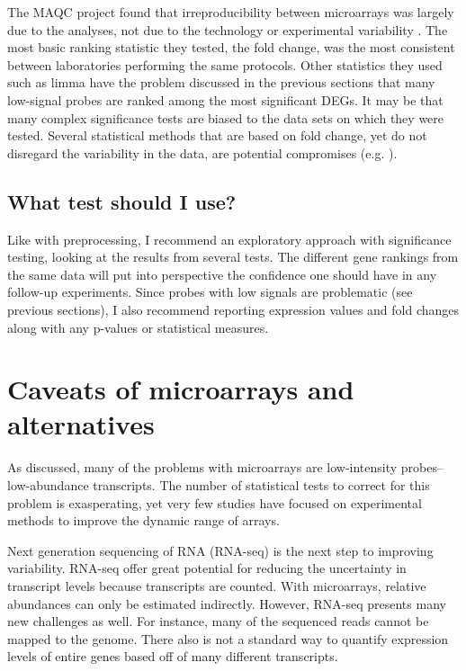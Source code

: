 The MAQC project found that irreproducibility between
microarrays was largely due to the analyses, not due to the technology
or experimental variability \cite{Shi:2006dl}.
The most basic ranking statistic they tested, the fold change, 
was the most consistent between laboratories performing the same protocols.
Other statistics they used such as limma have the problem discussed in the previous
sections that many low-signal probes are ranked among the most significant DEGs.
It may be that many complex significance tests are biased to
the data sets on which they were tested. Several statistical
methods that are based on fold change, yet do not disregard
the variability in the data, are potential 
compromises (e.g. \cite{Dembele:2014cn,Yanofsky:2010by,Farztdinov:2012to,
Theilhaber:2001uc,McCarthy:2009dn,Stevens:2010jk,Deng:2009vh,Hein:2006jo}).


\subsection{What test should I use?}

Like with preprocessing, I recommend an exploratory approach
with significance testing, looking at the results from several tests. 
The different gene rankings from the same data
will put into perspective the confidence one should have
in any follow-up experiments. Since probes with low signals
are problematic (see previous sections), I also recommend reporting
expression values and fold changes along with any p-values
or statistical measures.


\section{Caveats of microarrays and alternatives}

As discussed, many of the problems with microarrays are low-intensity probes--
low-abundance transcripts. The number of statistical tests to correct
for this problem is exasperating, yet very few studies have
focused on experimental methods to improve the dynamic range
of arrays. 

Next generation sequencing of RNA (RNA-seq) is the
next step to improving variability. RNA-seq offer great
potential for reducing the uncertainty in transcript levels because
transcripts are counted. With microarrays, relative abundances
can only be estimated indirectly. However, RNA-seq presents
many new challenges as well. For instance, many of the sequenced
reads cannot be mapped to the genome. There also is not
a standard way to quantify expression
levels of entire genes based off of many different transcripts.

